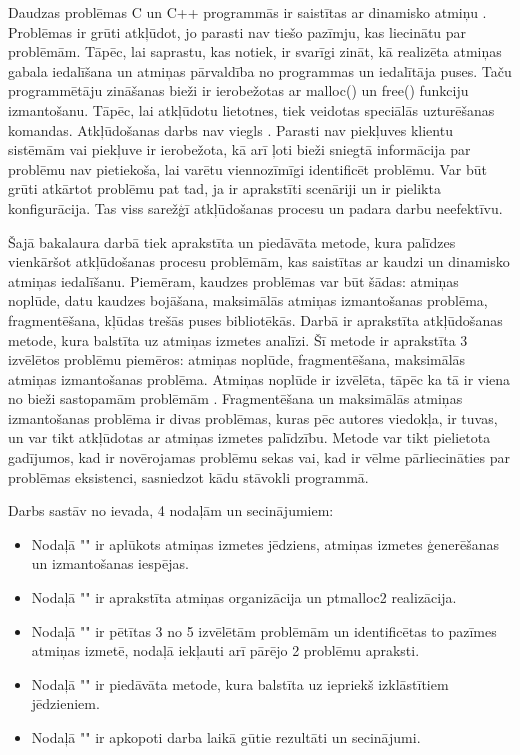 ﻿Daudzas problēmas C un C++ programmās ir saistītas ar dinamisko atmiņu \cite{TFM}.
Problēmas ir grūti atkļūdot, jo parasti nav tiešo pazīmju, kas liecinātu par problēmām.
Tāpēc, lai saprastu, kas notiek, ir svarīgi zināt, kā realizēta atmiņas gabala iedalīšana un atmiņas pārvaldība no programmas un iedalītāja puses.
Taču programmētāju zināšanas bieži ir ierobežotas ar malloc() un free() funkciju izmantošanu. 
Tāpēc, lai atkļūdotu lietotnes, tiek veidotas speciālās uzturēšanas komandas.
Atkļūdošanas darbs nav viegls \cite{ER}. Parasti nav piekļuves klientu sistēmām vai piekļuve ir ierobežota, kā arī ļoti bieži sniegtā informācija par problēmu nav pietiekoša, lai varētu viennozīmīgi identificēt problēmu.
Var būt grūti atkārtot problēmu pat tad, ja ir aprakstīti scenāriji un ir pielikta konfigurācija.
Tas viss sarežģī atkļūdošanas procesu un padara darbu neefektīvu.

Šajā bakalaura darbā tiek aprakstīta un piedāvāta metode, kura palīdzes vienkāršot atkļūdošanas procesu problēmām, kas saistītas ar kaudzi un dinamisko atmiņas iedalīšanu.
Piemēram, kaudzes problēmas var būt šādas: atmiņas noplūde, datu kaudzes bojāšana, maksimālās atmiņas izmantošanas problēma, fragmentēšana, kļūdas trešās puses bibliotēkās.
Darbā ir aprakstīta atkļūdošanas metode, kura balstīta uz atmiņas izmetes analīzi.
Šī metode ir aprakstīta 3 izvēlētos problēmu piemēros: atmiņas noplūde, fragmentēšana, maksimālās atmiņas izmantošanas problēma.
Atmiņas noplūde ir izvēlēta, tāpēc ka tā ir viena no bieži sastopamām problēmām \cite{GNED}.
Fragmentēšana un maksimālās atmiņas izmantošanas problēma ir divas problēmas, kuras pēc autores viedokļa, ir tuvas, un var tikt atkļūdotas ar atmiņas izmetes palīdzību.
Metode var tikt pielietota gadījumos, kad ir novērojamas problēmu sekas vai, kad ir vēlme pārliecināties par problēmas eksistenci, sasniedzot kādu stāvokli programmā.



Darbs sastāv no ievada, 4 nodaļām un secinājumiem:
\begin{itemize}
    \item Nodaļā "{\@nodone}" ir aplūkots atmiņas izmetes jēdziens, atmiņas izmetes ģenerēšanas un izmantošanas iespējas.
    \item Nodaļā "{\@nodtwo}" ir aprakstīta atmiņas organizācija un  ptmalloc2 realizācija. 
    \item Nodaļā "{\@nodthree}" ir pētītas 3 no 5 izvēlētām problēmām un identificētas to pazīmes atmiņas izmetē, nodaļā iekļauti arī pārējo 2 problēmu apraksti.
    \item Nodaļā "{\@nodfour}" ir piedāvāta metode, kura balstīta uz iepriekš izklāstītiem jēdzieniem.
    \item Nodaļā "{\@nodsix}" ir apkopoti darba laikā gūtie rezultāti un secinājumi.
\end{itemize} 
